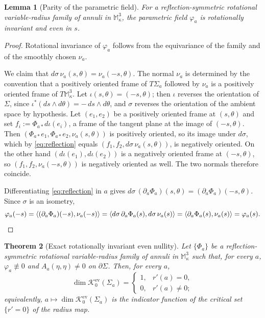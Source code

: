 \documentclass[11pt,a4paper]{amsart}
\theoremstyle{plain}
\newtheorem{theorem}{Theorem}[section]
\newtheorem{lemma}[theorem]{Lemma}
\theoremstyle{definition}
\newcommand{\M}{\mathbb{M}}
\newcommand{\Ker}{\mathcal{K}}
\begin{document}
\begin{lemma}[Parity of the parametric field]\label{lem:even}
For a reflection-symmetric rotational variable-radius family of annuli in $\M^3_\kappa$, the parametric field $\varphi_a$ is rotationally invariant and even in $s$.
\end{lemma}

\begin{proof}
Rotational invariance of $\varphi_a$ follows from the equivariance of the family and of the smoothly chosen $\nu_a$.

We claim that $d\sigma\,\nu_a(s,\theta)=\nu_a(-s,\theta)$. The normal $\nu_a$ is determined by the convention that a positively oriented frame of $T\Sigma_a$ followed by $\nu_a$ is a positively oriented frame of $T\M^3_\kappa$. Let $\iota(s,\theta)=(-s,\theta)$; then $\iota$ reverses the orientation of $\Sigma$, since $\iota^*(ds\wedge d\theta)=-\,ds\wedge d\theta$, and $\sigma$ reverses the orientation of the ambient space by hypothesis. Let $(e_1,e_2)$ be a positively oriented frame at $(s,\theta)$ and set $f_i:=\Phi_{a*}d\iota(e_i)$, a frame of the tangent plane at the image of $(-s,\theta)$. Then $(\Phi_{a*}e_1,\Phi_{a*}e_2,\nu_a(s,\theta))$ is positively oriented, so its image under $d\sigma$, which by \eqref{eq:reflection} equals $(f_1,f_2,d\sigma\,\nu_a(s,\theta))$, is negatively oriented. On the other hand $(d\iota(e_1),d\iota(e_2))$ is a negatively oriented frame at $(-s,\theta)$, so $(f_1,f_2,\nu_a(-s,\theta))$ is negatively oriented as well. The two normals therefore coincide.

Differentiating \eqref{eq:reflection} in $a$ gives $d\sigma\,(\partial_a\Phi_a)(s,\theta)=(\partial_a\Phi_a)(-s,\theta)$. Since $\sigma$ is an isometry,
\[
\varphi_a(-s)=\langle(\partial_a\Phi_a)(-s),\nu_a(-s)\rangle=\langle d\sigma\,\partial_a\Phi_a(s),d\sigma\,\nu_a(s)\rangle=\langle\partial_a\Phi_a(s),\nu_a(s)\rangle=\varphi_a(s).\qedhere
\]
\end{proof}

\begin{theorem}[Exact rotationally invariant even nullity]\label{thm:exactnul}
Let $\{\Phi_a\}$ be a reflection-symmetric rotational variable-radius family of annuli in $\M^3_\kappa$ such that, for every $a$, $\varphi_a\not\equiv 0$ and $A_a(\eta,\eta)\neq 0$ on $\partial\Sigma$. Then, for every $a$,
\[
\dim\Ker_0^{\mathrm{ev}}(\Sigma_a)=
\begin{cases}
1,&r'(a)=0,\\
0,&r'(a)\neq 0;
\end{cases}
\]
equivalently, $a\mapsto\dim\Ker_0^{\mathrm{ev}}(\Sigma_a)$ is the indicator function of the critical set $\{r'=0\}$ of the radius map.
\end{theorem}
\end{document}
